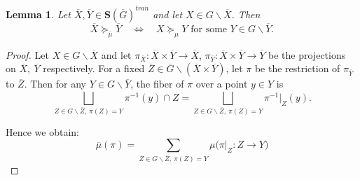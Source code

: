\documentclass[11pt,a4paper]{amsart}
\theoremstyle{plain}%
\newtheorem{lemma}{Lemma}[subsection]
\theoremstyle{definition}
\theoremstyle{remark}
\newcommand{\Set}[1]{\mathbf{S}(#1)}
\newcommand{\oG}{{\overline{G}}}
\newcommand{\oX}{{\overline{X}}}
\begin{document}
   \begin{lemma}\label{lem:orbitwise-order}
Let $\oX,\overline{Y}\in \Set{\oG}^{tran}$ and let $X\in G\backslash\oX$. Then
\[
 \oX\succeq_{\overline{\mu}}\overline{Y}
 \quad\Longleftrightarrow\quad
 X\succeq_{\mu} Y \text{ for some } Y\in G\backslash\overline{Y}.
\]
   \end{lemma}
  \begin{proof}
Let $X\in G\backslash\oX$ and let $\pi_{\overline{X}}: \oX\times \overline{Y} \to  \overline{X}$, $\pi_{\overline{Y}}: \oX\times \overline{Y} \to  \overline{Y}$ be the projections on $\oX, ~ \overline{Y}$ respectively. For a fixed $\overline{Z}\in \overline{G}\backslash( \oX\times \overline{Y})$, let $\pi$ be the restriction of $\pi_{\overline{Y}}$ to ${\overline{Z}}$. Then for any $Y\in G \backslash\overline{Y}$, the fiber of $\pi$ over a point $y\in Y$ is $$\bigsqcup_{Z\in G\backslash\overline{Z}, ~ \pi(Z)=Y} \pi^{-1}(y)\cap Z = \bigsqcup_{Z\in G\backslash\overline{Z}, ~ \pi(Z)=Y} \pi^{-1}\rvert_Z(y).$$

Hence we obtain: 
\begin{equation}\label{eq:fibre-sum}
\overline{\mu}(\pi) = \sum_{Z \in G\backslash\overline{Z}, ~ \pi(Z)=Y}\mu\bigl(\pi|_{Z}:Z\to Y\bigr)
\end{equation}
  

\end{proof}
\end{document}
